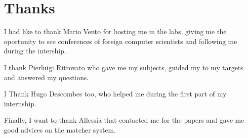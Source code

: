 \chapter*{Thanks}
\par I had like to thank Mario Vento for hosting me in the labs, giving me the oportunity to see conferences of foreign computer scientists and following me during the intership.	
\par I thank Pierluigi Ritrovato who gave me my subjects, guided my to my targets and answered my questions.
\par I Thank Hugo Descombes too, who helped me during the first part of my internship. 
\par Finally, I want to thank Allessia that contacted me for the papers and gave me good advices on the matcher system.